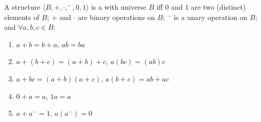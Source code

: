 A structure $\langle B, +, \cdot, ^-, 0, 1 \rangle$ is a  with universe $B$ iff $0$ and $1$ are two (distinct) elements of $B$; $+$ and $\cdot$ are binary operations on $B$; $^-$ is a unary operation on $B$; and $\forall a, b, c \in B$:

\begin{enumerate}
\item $a + b = b + a$, \quad $ab = ba$ \qquad {}
\item $a + (b + c) = (a + b) + c$, \quad $a(bc) = (ab)c$ \qquad {}
\item $a + bc = (a + b)(a + c)$, \quad $a(b + c) = ab + ac$ \qquad {}
\item $0 + a = a$, \quad $1a = a$ \qquad {}
\item $a + a^- = 1$, \quad $a(a^-) = 0$ \qquad {}
\end{enumerate}
